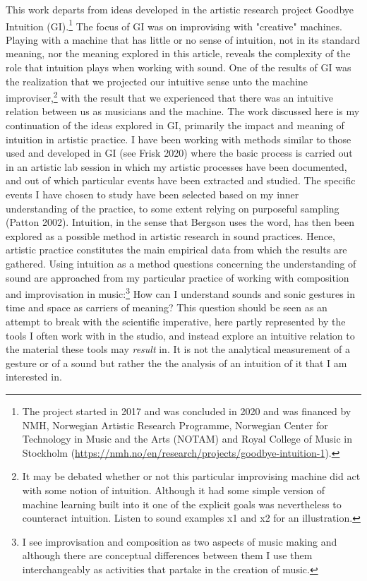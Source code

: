 \documentclass[11pt]{article}
\makeatletter
\newcommand{\cslcitation}[2]
 {\protect\hyper@linkstart{cite}{citeproc_bib_item_#1}#2\hyper@linkend}
\makeatother
\begin{document}
This work departs from ideas developed in the artistic research project Goodbye Intuition (GI).\footnote{The project started in 2017 and was concluded in 2020 and was financed by NMH, Norwegian Artistic Research Programme, Norwegian Center for Technology in Music and the Arts (NOTAM) and Royal College of Music in Stockholm (\url{https://nmh.no/en/research/projects/goodbye-intuition-1}).}
The focus of GI was on improvising with "creative" machines.
Playing with a machine that has little or no sense of intuition, not in its standard meaning, nor the meaning explored in this article, reveals the complexity of the role that intuition plays when working with sound.
One of the results of GI was the realization that we projected our  intuitive sense unto the machine improviser,\footnote{It may be debated whether or not this particular improvising machine did act with some notion of intuition. Although it had some simple version of machine learning built into it one of the explicit goals was nevertheless to counteract intuition. Listen to sound examples x1 and x2 for an illustration.} with the result that we experienced that there was an intuitive relation between us as musicians and the machine.
The work discussed here is my  continuation of the ideas explored in GI, primarily the impact and meaning of intuition in artistic practice.
I have been working with methods similar to those used and developed in GI (see \cslcitation{15}{Frisk 2020}) where the basic process is carried out in an artistic lab session in which my  artistic processes have been documented, and out of which particular events have been extracted and studied.
The specific events I have chosen to study have been selected based on my  inner understanding of the practice, to some extent relying on purposeful sampling (\cslcitation{27}{Patton 2002}).
Intuition, in the sense that Bergson uses the word, has then been explored as a possible method in artistic research in sound practices.
Hence, artistic practice constitutes the main empirical data from which the results are gathered.
Using intuition as a method questions concerning the understanding of sound are approached from my particular practice of working with composition and improvisation in music:\footnote{I see improvisation and composition as two aspects of music making and although there are conceptual differences between them I use them interchangeably as activities that partake in the creation of music.}
How can I understand sounds and sonic gestures in time and space as carriers of meaning?
This question should be seen as an attempt to break with the scientific imperative, here partly represented by the tools I often work with in the studio, and instead explore an intuitive relation to the material these tools may \emph{result} in.
It is not the analytical measurement of a gesture or of a sound but rather the the analysis of an intuition of it that I am interested in.
\end{document}
